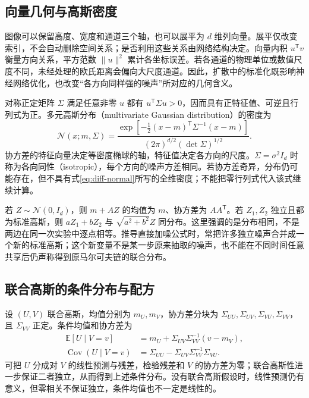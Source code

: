 \documentclass[UTF8,12pt,a4paper,fontset=fandol]{ctexart}
\begin{document}
\subsection{向量几何与高斯密度}
图像可以保留高度、宽度和通道三个轴，也可以展平为 $d$ 维列向量。展平仅改变索引，不会自动删除空间关系；是否利用这些关系由网络结构决定。向量内积 $u^\mathsf T v$ 衡量方向关系，平方范数 $\|u\|^2$ 累计各坐标误差。若各通道的物理单位或数值尺度不同，未经处理的欧氏距离会偏向大尺度通道。因此，扩散中的标准化既影响神经网络优化，也改变“各方向同样强的噪声”所对应的几何含义。

对称正定矩阵 $\Sigma$ 满足任意非零 $u$ 都有 $u^\mathsf T\Sigma u>0$，因而具有正特征值、可逆且行列式为正。多元高斯分布（multivariate Gaussian distribution）的密度为
\begin{equation}
 \mathcal N(x;m,\Sigma)=\frac{\exp[-\tfrac12(x-m)^\mathsf T\Sigma^{-1}(x-m)]}
 {(2\pi)^{d/2}(\det\Sigma)^{1/2}}.
 \label{eq:diff-normal}
\end{equation}
协方差的特征向量决定等密度椭球的轴，特征值决定各方向的尺度。$\Sigma=\sigma^2I_d$ 时称为各向同性（isotropic），每个方向的噪声方差相同。若协方差奇异，分布仍可能存在，但不具有式\eqref{eq:diff-normal}所写的全维密度；不能把零行列式代入该式继续计算。

若 $Z\sim\mathcal N(0,I_d)$，则 $m+AZ$ 的均值为 $m$、协方差为 $AA^\mathsf T$。若 $Z_1,Z_2$ 独立且都为标准高斯，则 $aZ_1+bZ_2$ 与 $\sqrt{a^2+b^2}Z$ 同分布。这里强调的是分布相同，不是两边在同一次实验中逐点相等。推导直接加噪公式时，常把许多独立噪声合并成一个新的标准高斯；这个新变量不是某一步原来抽取的噪声，也不能在不同时间任意共享后仍声称得到原马尔可夫链的联合分布。

\subsection{联合高斯的条件分布与配方}
设 $(U,V)$ 联合高斯，均值分别为 $m_U,m_V$，协方差分块为 $\Sigma_{UU},\Sigma_{UV},\Sigma_{VU},\Sigma_{VV}$，且 $\Sigma_{VV}$ 正定。条件均值和协方差为
\begin{align}
 \mathbb E[U\mid V=v]&=m_U+\Sigma_{UV}\Sigma_{VV}^{-1}(v-m_V),\label{eq:diff-gauss-cond-mean}\\
 \operatorname{Cov}(U\mid V=v)&=\Sigma_{UU}-\Sigma_{UV}\Sigma_{VV}^{-1}\Sigma_{VU}.
 \label{eq:diff-gauss-cond-var}
\end{align}
可把 $U$ 分成对 $V$ 的线性预测与残差，检验残差和 $V$ 的协方差为零；联合高斯性进一步保证二者独立，从而得到上述条件分布。没有联合高斯假设时，线性预测仍有意义，但零相关不保证独立，条件均值也不一定是线性的。
\end{document}
